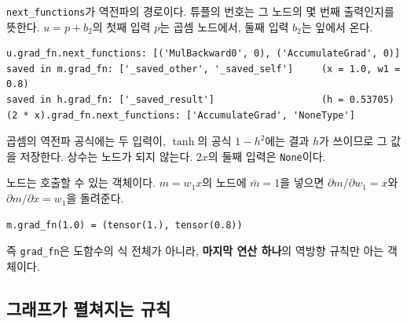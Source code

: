 \documentclass[11pt,a4paper]{article}
\begin{document}
\texttt{next\_functions}가 역전파의 경로이다. 튜플의 번호는 그 노드의 몇 번째 출력인지를 뜻한다.
$u=p+b_2$의 첫째 입력 $p$는 곱셈 노드에서, 둘째 입력 $b_2$는 잎에서 온다.
\begin{lstlisting}[language={},numbers=none]
u.grad_fn.next_functions: [('MulBackward0', 0), ('AccumulateGrad', 0)]
saved in m.grad_fn: ['_saved_other', '_saved_self']     (x = 1.0, w1 = 0.8)
saved in h.grad_fn: ['_saved_result']                   (h = 0.53705)
(2 * x).grad_fn.next_functions: ['AccumulateGrad', 'NoneType']
\end{lstlisting}
곱셈의 역전파 공식에는 두 입력이, $\tanh$의 공식 $1-h^2$에는 결과 $h$가 쓰이므로 그 값을 저장한다.
상수는 노드가 되지 않는다. $2x$의 둘째 입력은 \texttt{None}이다.

노드는 호출할 수 있는 객체이다. $m=w_1x$의 노드에 $\bar m=1$을 넣으면 $\partial m/\partial w_1=x$와 $\partial m/\partial x=w_1$을 돌려준다.
\begin{lstlisting}[language={},numbers=none]
m.grad_fn(1.0) = (tensor(1.), tensor(0.8))
\end{lstlisting}
즉 \texttt{grad\_fn}은 도함수의 식 전체가 아니라, \textbf{마지막 연산 하나}의 역방향 규칙만 아는 객체이다.

\subsection{그래프가 펼쳐지는 규칙}\label{sec:localrule}
\end{document}
